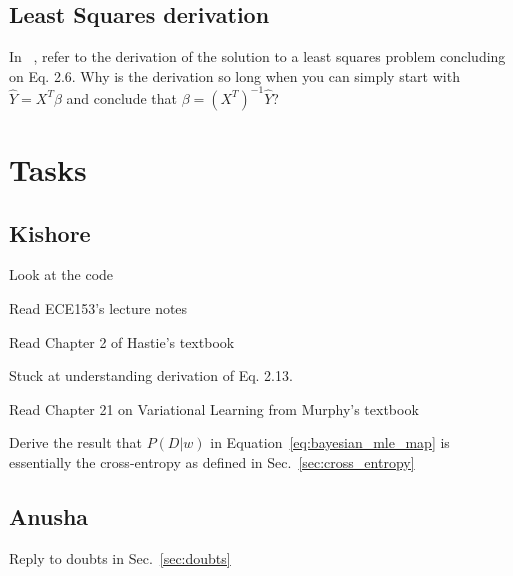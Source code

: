 \subsection{Least Squares derivation}
In ~\cite{friedman2001elements}, refer to the derivation of the solution to a least squares problem concluding on Eq. 2.6. Why is the derivation so long when you can simply start with $\hat{Y} = X^T \beta$ and conclude that $\beta = \left( X^T \right)^{-1} \hat{Y}$?


\section{Tasks}
\subsection{Kishore}
\begin{packed_itemize}
\item Look at the code
\item Read ECE153's lecture notes
\item Read Chapter 2 of Hastie's textbook
\begin{packed_itemize}
    \item Stuck at understanding derivation of Eq. 2.13.
\end{packed_itemize}
\item Read Chapter 21 on Variational Learning from Murphy's textbook
\item Derive the result that $P(D|w)$ in Equation~\ref{eq:bayesian_mle_map} is essentially the cross-entropy as defined in Sec.~\ref{sec:cross_entropy}
\end{packed_itemize}

\subsection{Anusha}
\begin{packed_enumerate}
\item Reply to doubts in Sec.~\ref{sec:doubts}
\end{packed_enumerate}
